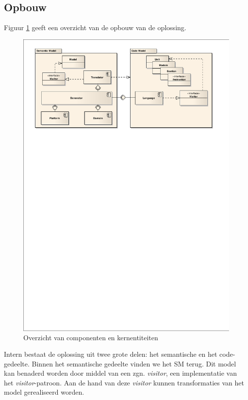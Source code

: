
\subsection{Opbouw}

Figuur \ref{fig:devel-component-overview} geeft een overzicht van de opbouw van
de oplossing.

\begin{figure}[ht]
  \centering
  \includegraphics[width=\linewidth]{resources/component-overview.pdf}
  \caption{Overzicht van componenten en kernentiteiten}
  \label{fig:devel-component-overview}
\end{figure}

Intern bestaat de oplossing uit twee grote delen: het semantische en het
code-gedeelte. Binnen het semantische gedeelte vinden we het SM terug. Dit
model kan benaderd worden door middel van een zgn. \emph{visitor}, een
implementatie van het \emph{visitor}-patroon. Aan de hand van deze
\emph{visitor} kunnen transformaties van het model gerealiseerd worden.


